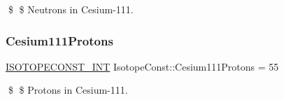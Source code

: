 \$ \$ Neutrons in Cesium-\/111. \mbox{\label{group___isotope_const-_cesium-_cs111_gafcf4dd62e198f810e8dcc4e460f96e5c}} 
\subsubsection{\texorpdfstring{Cesium111\+Protons}{Cesium111Protons}}
{\footnotesize\ttfamily \mbox{\hyperlink{group___isotope_const-_macros_ga5f18360b3e99483a35c32d789e62621c}{I\+S\+O\+T\+O\+P\+E\+C\+O\+N\+S\+T\+\_\+\+I\+NT}} Isotope\+Const\+::\+Cesium111\+Protons = 55}

\$ \$ Protons in Cesium-\/111. 